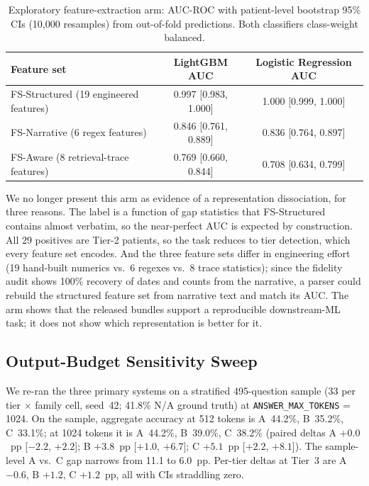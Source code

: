 \begin{table}[htbp]
\centering
\caption{Exploratory feature-extraction arm: AUC-ROC with patient-level bootstrap 95\%
CIs (10,000 resamples) from out-of-fold predictions.  Both classifiers class-weight
balanced.}
\label{tab:auc}
\begin{tabular}{lcc}
\toprule
Feature set & LightGBM AUC & Logistic Regression AUC \\
\midrule
FS-Structured (19 engineered features) & 0.997 [0.983, 1.000] & 1.000 [0.999, 1.000] \\
FS-Narrative (6 regex features)        & 0.846 [0.761, 0.889] & 0.836 [0.764, 0.897] \\
FS-Aware (8 retrieval-trace features)  & 0.769 [0.660, 0.844] & 0.708 [0.634, 0.799] \\
\bottomrule
\end{tabular}
\end{table}

We no longer present this arm as evidence of a representation dissociation, for three
reasons.  The label is a function of gap statistics that FS-Structured contains almost
verbatim, so the near-perfect AUC is expected by construction.  All 29 positives are
Tier-2 patients, so the task reduces to tier detection, which every feature set encodes.
And the three feature sets differ in engineering effort (19 hand-built numerics vs.\ 6
regexes vs.\ 8 trace statistics); since the fidelity audit shows 100\% recovery of dates
and counts from the narrative, a parser could rebuild the structured feature set from
narrative text and match its AUC.  The arm shows that the released bundles support a
reproducible downstream-ML task; it does not show which representation is better for it.

\subsection{Output-Budget Sensitivity Sweep}
\label{sec:results:budget_sweep}

We re-ran the three primary systems on a stratified 495-question sample (33 per
tier $\times$ family cell, seed~42; 41.8\% N/A ground truth) at
\texttt{ANSWER\_MAX\_TOKENS} = 1024.  On the sample, aggregate accuracy at 512 tokens is
A~44.2\%, B~35.2\%, C~33.1\%; at 1024 tokens it is A~44.2\%, B~39.0\%, C~38.2\%
(paired deltas A $+0.0$~pp [$-2.2$, $+2.2$]; B $+3.8$~pp [$+1.0$, $+6.7$]; C
$+5.1$~pp [$+2.2$, $+8.1$]).  The sample-level A vs.\ C gap narrows from 11.1 to
6.0~pp.  Per-tier deltas at Tier~3 are A $-0.6$, B $+1.2$, C $+1.2$~pp, all with CIs
straddling zero.


